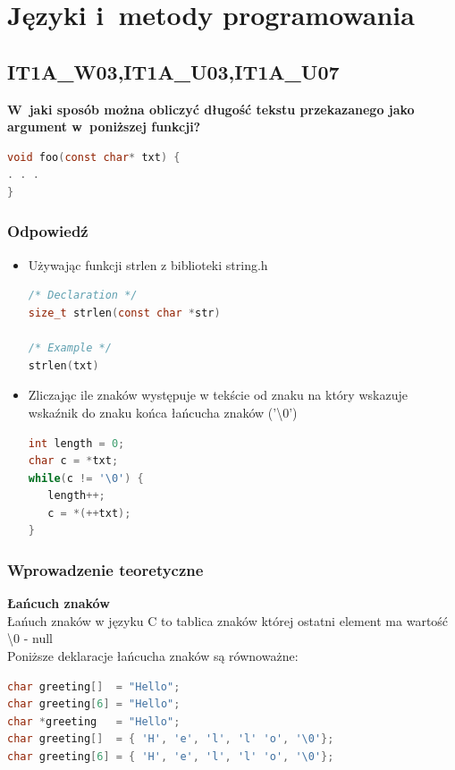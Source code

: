 \chapter{Języki i~metody programowania}
\PartialToc
\section{IT1A\_W03,IT1A\_U03,IT1A\_U07}
\textbf{W~jaki sposób można obliczyć długość tekstu przekazanego jako argument w~poniższej funkcji?}
\begin{lstlisting}[language=c]
void foo(const char* txt) {
. . .
}
\end{lstlisting}
\subsection{Odpowiedź}

\begin{itemize}
\item Używając funkcji strlen z biblioteki string.h
\begin{lstlisting}[language=c]
/* Declaration */
size_t strlen(const char *str)

/* Example */
strlen(txt)
\end{lstlisting}

\item Zliczając ile znaków występuje w tekście od znaku na który wskazuje wskaźnik do znaku końca łańcucha znaków ('\textbackslash0')
\begin{lstlisting}[language=c]
int length = 0;
char c = *txt;
while(c != '\0') {
   length++;
   c = *(++txt);
}
\end{lstlisting}
\end{itemize}
  
\subsection{Wprowadzenie teoretyczne}
\textbf{Łańcuch znaków}\\
Łańuch znaków w języku C to tablica znaków której ostatni element ma wartość \textbackslash0 - null\\
Poniższe deklaracje łańcucha znaków są równoważne:
\begin{lstlisting}[language=c]
char greeting[]  = "Hello";
char greeting[6] = "Hello";
char *greeting   = "Hello";
char greeting[]  = { 'H', 'e', 'l', 'l' 'o', '\0'};
char greeting[6] = { 'H', 'e', 'l', 'l' 'o', '\0'};
\end{lstlisting}

